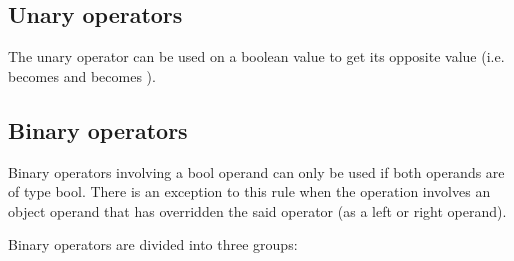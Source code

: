 \subsection{Unary operators}

The unary operator \token{!} can be used on a boolean value to get its opposite
value (i.e.  becomes  and  becomes
).

\subsection{Binary operators}

Binary operators involving a bool operand can only be used if both operands are
of type bool. There is an exception to this rule when the operation involves an
object operand that has overridden the said operator (as a left or right
operand).

Binary operators are divided into three groups:

